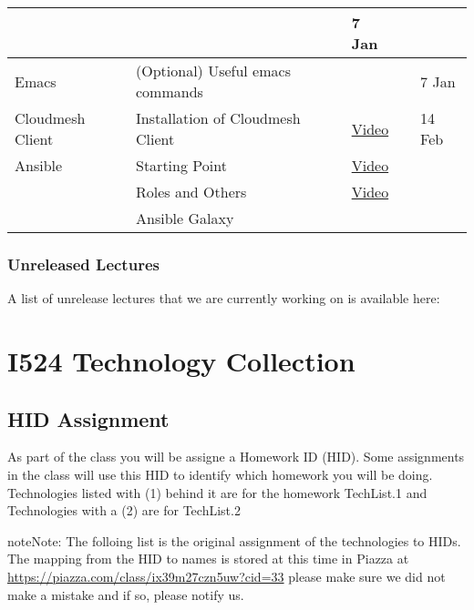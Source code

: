 \begin{threeparttable}
\begin{tabulary}{\linewidth}{|L|L|L|L|L|}
&&
7 Jan
\\
\hline
Emacs
&
(Optional) Useful emacs commands
&
{\hyperref[\detokenize{lesson/doc/emacs::doc}]{}}
&&
7 Jan
\\
\hline
Cloudmesh Client
&
Installation of Cloudmesh Client
&
\href{https://www.youtube.com/watch?v=R50IQYhr-vg}{Video} \textbar{} 
&&
14 Feb
\\
\hline
Ansible
&
Starting Point
&
\href{https://www.youtube.com/watch?v=no52OmHg1ek}{Video} \textbar{} 
&&\\
\hline&
Roles and Others
&
\href{https://www.youtube.com/watch?v=eN52x5XxJAE}{Video} \textbar{} 
&&\\
\hline&
Ansible Galaxy
&
&&\\
\hline\end{tabulary}

\end{threeparttable}



\subsection{Unreleased Lectures}
\label{\detokenize{i524/lectures:unreleased-lectures}}
A list of unrelease lectures that we are currently working on is
available here: 


\chapter{I524 Technology Collection}
\label{\detokenize{notes:i524-technology-collection}}

\section{HID Assignment}
\label{\detokenize{i524/hids-techs::doc}}\label{\detokenize{i524/hids-techs:hid-assignment}}
As part of the class you will be assigne a Homework ID (HID). Some
assignments in the class will use this HID to identify which homework
you will be doing. Technologies listed with (1) behind it are for the homework
TechList.1 and Technologies with a (2) are for TechList.2

\begin{sphinxadmonition}{note}{Note:}
The folloing list is the original assignment of the technologies to
HIDs.  The mapping from the HID to names is stored at this time in
Piazza at \url{https://piazza.com/class/ix39m27czn5uw?cid=33} please make
sure we did not make a mistake and if so, please notify us.
\end{sphinxadmonition}

